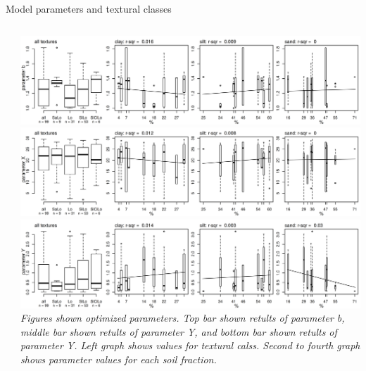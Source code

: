 \begin{block}{Model parameters and textural classes}
\begin{columns}
\begin{column}{0.2\textwidth}
    \end{column}
    \begin{column}{0.8\textwidth}
        \includegraphics[width = \textwidth]{obr/bfittex.png}\\
        \includegraphics[width = \textwidth]{obr/Xfittex.png}\\
        \includegraphics[width = \textwidth]{obr/Yfittex.png}
        {\it Figures shown optimized parameters. Top bar shown retults of parameter b, middle bar shown retults of parameter Y, and bottom bar shown retults of parameter Y. Left graph shows values for textural calss. Second to fourth graph shows parameter values for each soil fraction.}
    \end{column}
\end{columns} 

\end{block}

% 
